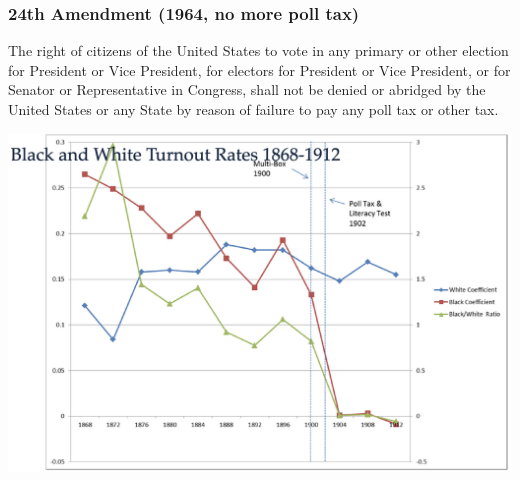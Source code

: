 \documentclass[aspectratio=169]{beamer}
\theoremstyle{principle}
\begin{document}
\begin{frame}
\frametitle{24th Amendment (1964, no more poll tax)}
The right of citizens of the United States to vote in any primary or other election for President or Vice President, for electors for President or Vice President, or for Senator or Representative in Congress, shall not be denied or abridged by the United States or any State by reason of failure to pay any poll tax or other tax.
\begin{center}
\includegraphics[scale=0.25]{black_white_turnout.png}
\end{center}

\end{frame}
\end{document}
